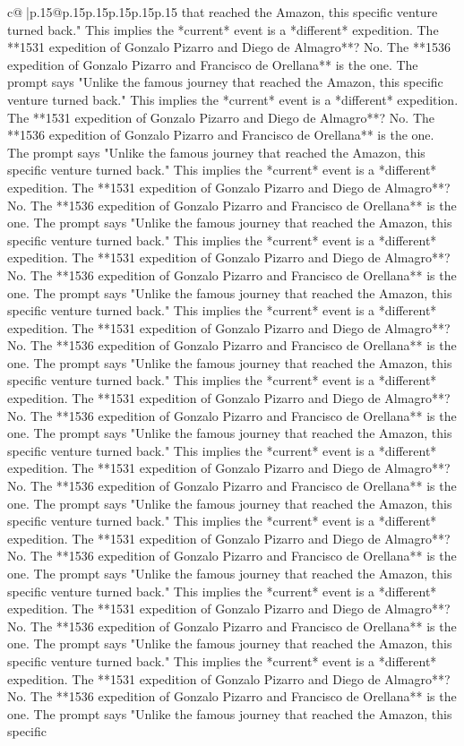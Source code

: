 \documentclass{article}
\begin{document}
{\begin{supertabular}{c@{$\;$}|p{.15\linewidth}@{}p{.15\linewidth}p{.15\linewidth}p{.15\linewidth}p{.15\linewidth}p{.15\linewidth}}
{{{that reached the Amazon, this specific venture turned back." This implies the *current* event is a *different* expedition. The **1531 expedition of Gonzalo Pizarro and Diego de Almagro**? No. The **1536 expedition of Gonzalo Pizarro and Francisco de Orellana** is the one. The prompt says "Unlike the famous journey that reached the Amazon, this specific venture turned back." This implies the *current* event is a *different* expedition. The **1531 expedition of Gonzalo Pizarro and Diego de Almagro**? No. The **1536 expedition of Gonzalo Pizarro and Francisco de Orellana** is the one. The prompt says "Unlike the famous journey that reached the Amazon, this specific venture turned back." This implies the *current* event is a *different* expedition. The **1531 expedition of Gonzalo Pizarro and Diego de Almagro**? No. The **1536 expedition of Gonzalo Pizarro and Francisco de Orellana** is the one. The prompt says "Unlike the famous journey that reached the Amazon, this specific venture turned back." This implies the *current* event is a *different* expedition. The **1531 expedition of Gonzalo Pizarro and Diego de Almagro**? No. The **1536 expedition of Gonzalo Pizarro and Francisco de Orellana** is the one. The prompt says "Unlike the famous journey that reached the Amazon, this specific venture turned back." This implies the *current* event is a *different* expedition. The **1531 expedition of Gonzalo Pizarro and Diego de Almagro**? No. The **1536 expedition of Gonzalo Pizarro and Francisco de Orellana** is the one. The prompt says "Unlike the famous journey that reached the Amazon, this specific venture turned back." This implies the *current* event is a *different* expedition. The **1531 expedition of Gonzalo Pizarro and Diego de Almagro**? No. The **1536 expedition of Gonzalo Pizarro and Francisco de Orellana** is the one. The prompt says "Unlike the famous journey that reached the Amazon, this specific venture turned back." This implies the *current* event is a *different* expedition. The **1531 expedition of Gonzalo Pizarro and Diego de Almagro**? No. The **1536 expedition of Gonzalo Pizarro and Francisco de Orellana** is the one. The prompt says "Unlike the famous journey that reached the Amazon, this specific venture turned back." This implies the *current* event is a *different* expedition. The **1531 expedition of Gonzalo Pizarro and Diego de Almagro**? No. The **1536 expedition of Gonzalo Pizarro and Francisco de Orellana** is the one. The prompt says "Unlike the famous journey that reached the Amazon, this specific venture turned back." This implies the *current* event is a *different* expedition. The **1531 expedition of Gonzalo Pizarro and Diego de Almagro**? No. The **1536 expedition of Gonzalo Pizarro and Francisco de Orellana** is the one. The prompt says "Unlike the famous journey that reached the Amazon, this specific venture turned back." This implies the *current* event is a *different* expedition. The **1531 expedition of Gonzalo Pizarro and Diego de Almagro**? No. The **1536 expedition of Gonzalo Pizarro and Francisco de Orellana** is the one. The prompt says "Unlike the famous journey that reached the Amazon, this specific }}}
\end{supertabular}}
\end{document}
